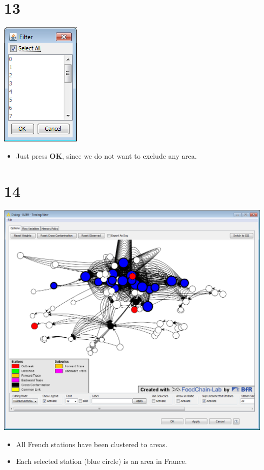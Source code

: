 \documentclass{beamer}
\begin{document}
\section{13}
\begin{frame}
	\begin{center}
  		\includegraphics[height=0.5\textheight]{13.png}
	\end{center}
	\begin{itemize}
		\item Just press \textbf{OK}, since we do not want to exclude any area.
	\end{itemize}
\end{frame}

\section{14}
\begin{frame}
	\begin{center}
  		\includegraphics[height=0.6\textheight]{14.png}
	\end{center}
	\begin{itemize}
		\item All French stations have been clustered to areas.
		\item Each selected station (blue circle) is an area in France.		
	\end{itemize}
\end{frame}
\end{document}
